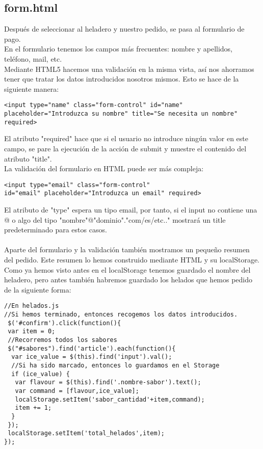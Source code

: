\documentclass[11pt,a4paper]{article}
\begin{document}
\subsection{form.html}
Después de seleccionar al heladero y nuestro pedido, se pasa al formulario de pago.\\
En el formulario tenemos los campos más frecuentes: nombre y apellidos, teléfono, mail, etc.\\
Mediante HTML5 hacemos una validación en la misma vista, así nos ahorramos tener que tratar los datos introducidos nosotros mismos. Esto se hace de la siguiente manera:
\begin{lstlisting}
<input type="name" class="form-control" id="name" 
placeholder="Introduzca su nombre" title="Se necesita un nombre" 
required>
\end{lstlisting}

El atributo "required" hace que si el usuario no introduce ningún valor en este campo, se pare la ejecución de la acción de submit y muestre el contenido del atributo "title".\\
La validación del formulario en HTML puede ser más compleja:\\
\begin{lstlisting}
<input type="email" class="form-control" 
id="email" placeholder="Introduzca un email" required>
\end{lstlisting}
El atributo de "type" espera un tipo email, por tanto, si el input no contiene una @ o algo del tipo "nombre"@"dominio"."com/es/etc.." mostrará un title predeterminado para estos casos.\\
\\
Aparte del formulario y la validación también mostramos un pequeño resumen del pedido. Este resumen lo hemos construido mediante HTML y su localStorage. Como ya hemos visto antes en el localStorage tenemos guardado el nombre del heladero, pero antes también habremos guardado los helados que hemos pedido de la siguiente forma:\\
\begin{lstlisting}
//En helados.js
//Si hemos terminado, entonces recogemos los datos introducidos.
 $('#confirm').click(function(){
 var item = 0;
 //Recorremos todos los sabores
 $("#sabores").find('article').each(function(){
  var ice_value = $(this).find('input').val();
  //Si ha sido marcado, entonces lo guardamos en el Storage
  if (ice_value) {
   var flavour = $(this).find('.nombre-sabor').text();
   var command = [flavour,ice_value];
   localStorage.setItem('sabor_cantidad'+item,command);
   item += 1;
  }
 });
 localStorage.setItem('total_helados',item);
});
\end{lstlisting}
\end{document}

